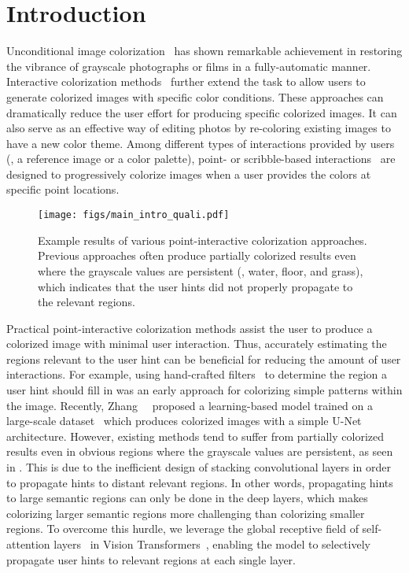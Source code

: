 \documentclass[10pt,twocolumn,letterpaper]{article}
\begin{document}
\vspace{-0.5cm}
\section{Introduction}
\vspace{-0.1cm}

Unconditional image colorization~\cite{coltran, instanceaware, cic, chromagan, Iizuka2016letcolor, memo} has shown remarkable achievement in restoring the vibrance of grayscale photographs or films in a fully-automatic manner. 
Interactive colorization methods~\cite{he2018deep, xu2020stylization,  zhang2019deep, zhang2017, levin2004, side} further extend the task to allow users to generate colorized images with specific color conditions. 
These approaches can dramatically reduce the user effort for producing specific colorized images. 
It can also serve as an effective way of editing photos by re-coloring existing images to have a new color theme. 
Among different types of interactions provided by users (\eg, a reference image or a color palette), point- or scribble-based interactions~\cite{zhang2017, levin2004, side} are designed to progressively colorize images when a user provides the colors at specific point locations.  

\begin{figure}[t]
    \centering
    \texttt{[image: figs/main\_intro\_quali.pdf]}
\caption{Example results of various point-interactive colorization approaches. Previous approaches often produce partially colorized results even where the grayscale values are persistent (\eg, water, floor, and grass), which indicates that the user hints did not properly propagate to the relevant regions.} 
    \label{fig:intro_quali}
    \vspace{-0.7cm}
\end{figure}

Practical point-interactive colorization methods assist the user to produce a colorized image with minimal user interaction. 
Thus, accurately estimating the regions relevant to the user hint can be beneficial for reducing the amount of user interactions. 
For example, using hand-crafted filters~\cite{levin2004, side} to determine the region a user hint should fill in was an early approach for colorizing simple patterns within the image. 
Recently, Zhang~\etal~\cite{zhang2017} proposed a learning-based model trained on a large-scale dataset~\cite{imagenet} which produces colorized images with a simple U-Net architecture. 
However, existing methods tend to suffer from partially colorized results even in obvious regions where the grayscale values are persistent, as seen in . 
This is due to the inefficient design of stacking convolutional layers in order to propagate hints to distant relevant regions. 
In other words, propagating hints to large semantic regions can only be done in the deep layers, which makes colorizing larger semantic regions more challenging than colorizing smaller regions. 
To overcome this hurdle, we leverage the global receptive field of self-attention layers~\cite{attention} in Vision Transformers~\cite{vit}, enabling the model to selectively propagate user hints to relevant regions at each single layer. 
\end{document}
